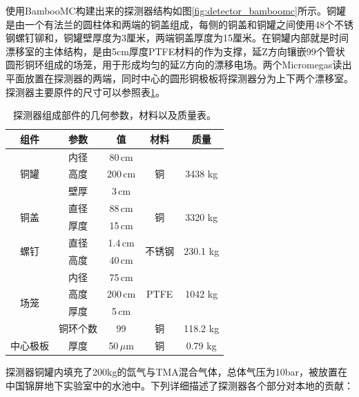 使用BambooMC构建出来的探测器结构如图\ref{fig:detector_bamboomc}所示。铜罐是由一个有法兰的圆柱体和两端的铜盖组成，每侧的铜盖和铜罐之间使用48个不锈钢螺钉铆和，铜罐壁厚度为3厘米，两端铜盖厚度为15厘米。在铜罐内部就是时间漂移室的主体结构，是由5cm厚度PTFE材料的作为支撑，延Z方向镶嵌99个管状圆形铜环组成的场笼，用于形成均匀的延Z方向的漂移电场。两个Micromegas读出平面放置在探测器的两端，同时中心的圆形铜极板将探测器分为上下两个漂移室。探测器主要原件的尺寸可以参照表\ref{tab:parameters_geometry}。
\begin{table}[thb]
    \begin{center}
        \begin{tabular*}{0.75\textwidth}{@{\extracolsep{\fill}}ccccc}
        \hline
        \hline
        \textbf{组件} & \textbf{参数} & \textbf{值} & \textbf{材料} & \textbf{质量} \\ \hline
        \multirow{3}{*}{铜罐} & 内径 & 80\,cm & \multirow{3}{*}{铜} & \multirow{3}{*}{3438 kg} \\
                    & 高度 & 200\,cm &  &    \\   
                    & 壁厚 & 3\,cm &  &    \\\hline
        \multirow{2}{*}{铜盖} & 直径 & 88\,cm & \multirow{2}{*}{铜} & \multirow{2}{*}{3320 kg} \\
                    & 厚度 & 15\,cm &  &    \\\hline
        \multirow{2}{*}{螺钉} & 直径 & 1.4\,cm & \multirow{2}{*}{不锈钢} & \multirow{2}{*}{230.1 kg} \\
                    & 高度 & 40\,cm &  &    \\\hline
        \multirow{4}{*}{场笼} & 内径 & 75\,cm & \multirow{3}{*}{PTFE} & \multirow{3}{*}{1042 kg} \\
                    & 高度 & 200\,cm &  & \\ 
                    & 厚度 & 5\,cm &  & \\ 
                    & 铜环个数 & 99 &    \multirow{1}{*}{铜}  & 118.2 kg \\\hline
        中心极板 & 厚度   &   50\,$\mu$m     &   \multirow{1}{*}{铜}  &    0.79 kg   \\   
        \hline
        \hline
        \end{tabular*}
        \caption{探测器组成部件的几何参数，材料以及质量表。\supercite{cdr}}
        \label{tab:parameters_geometry}
    \end{center}
\end{table}
  
探测器铜罐内填充了200kg的氙气与TMA混合气体，总体气压为10bar，被放置在中国锦屏地下实验室中的水池中。下列详细描述了探测器各个部分对本地的贡献：

